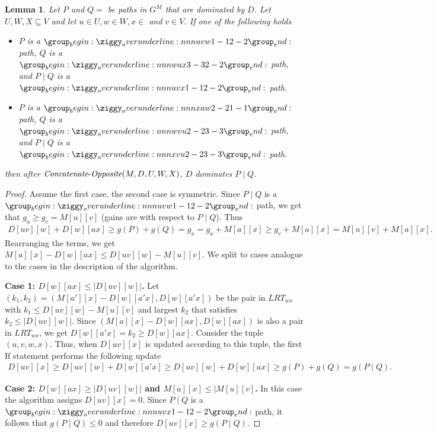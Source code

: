 \documentclass[11pt]{article}
\newtheorem{lemma}[theorem]{Lemma}
\newcommand{\CO}{\mbox{{\it Concatenate}-{\it Opposite}}}
\begin{document}
\begin{lemma}\label{lemma:concat-opposite-bounded}
    Let $P$ and $Q = $ be paths in $G^M$ that are dominated by $D$. Let $U,W,X\subseteq V$ and let $u\in U,w\in W,x\in $ and $v \in V$. If one of the following holds
    \begin{itemize}
        \item $P$ is a $\overunderline{uvw}{1-1}{2-2}$ path, $Q$ is a $\overunderline{wax}{3-3}{2-2}$ path, and $P\mid Q$ is a $\overunderline{uvx}{1-1}{2-2}$ path.
        \item $P$ is a $\overunderline{xaw}{2-2}{1-1}$ path, $Q$ is a $\overunderline{wvu}{2-2}{3-3}$ path, and $P\mid Q$ is a $\overunderline{xvu}{2-2}{3-3}$ path.
    \end{itemize}
    then after $\CO(M,D,U,W,X)$, $D$ dominates $P \mid Q$.
\end{lemma}

\begin{proof}
     Assume the first case, the second case is symmetric. Since $P \mid Q$ is a $\overunderline{{u}{v}{w}}{1-1}{2-2}$ path, we get that $g_{a}\ge g_{v} = M[u][v]$ (gains are with respect to $P \mid Q$). Thus 
     \begin{align*}
     D[u v][w] + D[w][ax]\ge g(P) + g(Q) = 
      g_{x} = g_{a} + M[a][x] \ge g_v+M[a][x] = M[u][v]+M[a][x].
     \end{align*}
     Rearranging the terms, we get $M[a][x]-D[w][ax]\le D[u v][w]-M[u][v]$. We split to cases analogue to the cases in the description of the algorithm.

     \textbf{Case 1: $D[w][ax]\le |D[uv][w]|$.}
     Let $(k_1,k_2)=(M[a'][x]-D[w][a'x], D[w][a'x])$ be the pair in $LRT_{wx}$ with $k_1 \le D[u v][w]-M[u][v]$ and largest $k_2$ that satisfies $k_2 \le |D[uv][w]|$. Since $(M[a][x]-D[w][ax], D[w][ax])$ is also a pair in $LRT_{wx}$, we get $D[w][a'x]=k_2 \ge D[w][ax]$. Consider the tuple $(u,v,w,x)$. Thus, when $D[uv][x]$ is updated according to this tuple, the first If statement performs the following update     \begin{align*}
         D[uv][x] \ge D[uv][w]+D[w][a'x] \ge D[uv][w]+D[w][ax] \ge g(P) + g(Q) = g(P\mid Q).
     \end{align*}

    \textbf{Case 2: $D[w][ax]\ge |D[uv][w]|$ and $M[a][x]\le |M[u][v]$.} 
    In this case the algorithm assigns $D[uv][x]=0$. Since $P\mid Q$ is a $\overunderline{uvx}{1-1}{2-2}$ path, it follows that $g(P\mid Q) \le 0$ and therefore $D[uv][x]\ge g(P \mid Q)$.
\end{proof}
\end{document}
